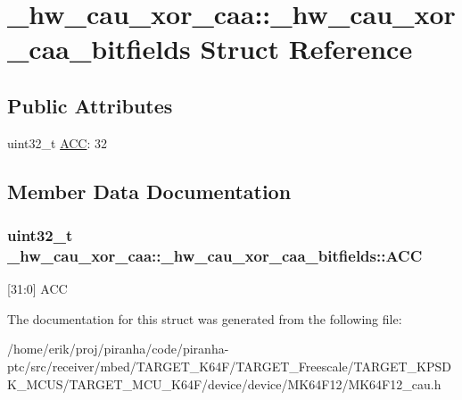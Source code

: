 \hypertarget{struct__hw__cau__xor__caa_1_1__hw__cau__xor__caa__bitfields}{}\section{\+\_\+hw\+\_\+cau\+\_\+xor\+\_\+caa\+:\+:\+\_\+hw\+\_\+cau\+\_\+xor\+\_\+caa\+\_\+bitfields Struct Reference}
\label{struct__hw__cau__xor__caa_1_1__hw__cau__xor__caa__bitfields}
\subsection*{Public Attributes}
\begin{DoxyCompactItemize}
\item 
uint32\+\_\+t \hyperlink{struct__hw__cau__xor__caa_1_1__hw__cau__xor__caa__bitfields_a9e8ee02479a1282e0611de95828af1fc}{A\+CC}\+: 32
\end{DoxyCompactItemize}


\subsection{Member Data Documentation}
\subsubsection[{\texorpdfstring{A\+CC}{ACC}}]{\setlength{\rightskip}{0pt plus 5cm}uint32\+\_\+t \+\_\+hw\+\_\+cau\+\_\+xor\+\_\+caa\+::\+\_\+hw\+\_\+cau\+\_\+xor\+\_\+caa\+\_\+bitfields\+::\+A\+CC}\hypertarget{struct__hw__cau__xor__caa_1_1__hw__cau__xor__caa__bitfields_a9e8ee02479a1282e0611de95828af1fc}{}\label{struct__hw__cau__xor__caa_1_1__hw__cau__xor__caa__bitfields_a9e8ee02479a1282e0611de95828af1fc}
\mbox{[}31\+:0\mbox{]} A\+CC 

The documentation for this struct was generated from the following file\+:\begin{DoxyCompactItemize}
\item 
/home/erik/proj/piranha/code/piranha-\/ptc/src/receiver/mbed/\+T\+A\+R\+G\+E\+T\+\_\+\+K64\+F/\+T\+A\+R\+G\+E\+T\+\_\+\+Freescale/\+T\+A\+R\+G\+E\+T\+\_\+\+K\+P\+S\+D\+K\+\_\+\+M\+C\+U\+S/\+T\+A\+R\+G\+E\+T\+\_\+\+M\+C\+U\+\_\+\+K64\+F/device/device/\+M\+K64\+F12/M\+K64\+F12\+\_\+cau.\+h\end{DoxyCompactItemize}
